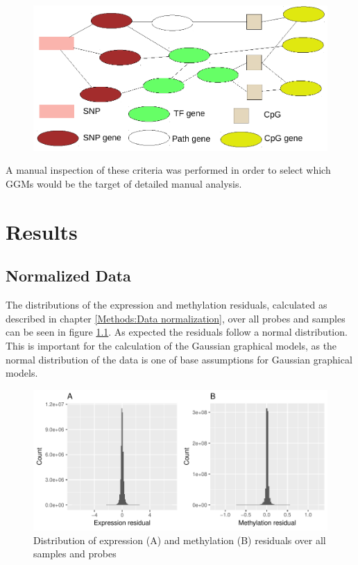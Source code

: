 \documentclass[a4paper,12pt,twoside,openright]{report}
\begin{document}
\begin{figure}[b!]
	\includegraphics[scale=0.92, keepaspectratio = true]{../figures/ggm_expectation_scheme}
	\caption{}
	\label{fig:ggm.expectation.scheme}
\end{figure}


A manual inspection of these criteria was performed in order to select which GGMs would be the target of detailed manual analysis. 

\newpage
\chapter{Results}
\label{Results}
\section{Normalized Data}
\label{Results:Normalized Data}
The distributions of the expression and methylation residuals, calculated as described in chapter \ref{Methods:Data normalization}, over all probes and samples can be seen in figure \ref{fig:expr.meth.res.hist}. As expected the residuals follow a normal distribution. This is important for the calculation of the Gaussian graphical models, as the normal distribution of the data is one of base assumptions for Gaussian graphical models\cite{Mohammadi2015}.

\begin{figure}[b!]
	\includegraphics[scale=1, keepaspectratio = true]{../figures/expr_meth_res_hist}
	\caption{Distribution of expression (A) and methylation (B) residuals over all samples and probes}
	\label{fig:expr.meth.res.hist}
\end{figure}
\end{document}
